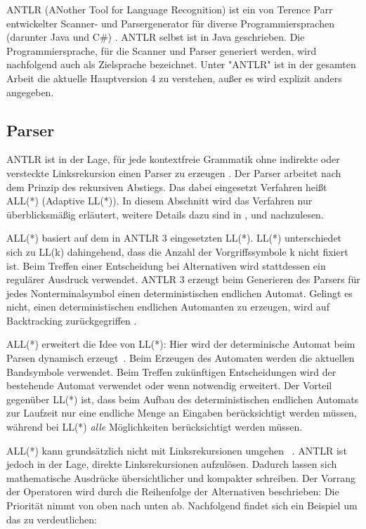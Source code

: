 ANTLR (ANother Tool for Language Recognition) ist ein von Terence Parr entwickelter Scanner- und Parsergenerator für diverse Programmiersprachen (darunter Java und C\#{}) \cite{ANTLR4Reference} \cite{ANTLRWebsite}. ANTLR selbst ist in Java geschrieben. Die Programmiersprache, für die Scanner und Parser generiert werden, wird nachfolgend auch als Zielsprache bezeichnet. Unter "ANTLR" ist in der gesamten Arbeit die aktuelle Hauptversion 4 zu verstehen, außer es wird explizit anders angegeben.

\subsection{Parser}

ANTLR ist in der Lage, für jede kontextfreie Grammatik ohne indirekte oder versteckte Linksrekursion einen Parser zu erzeugen \cite{ANTLRALLStar}. Der Parser arbeitet nach dem Prinzip des rekursiven Abstiegs. Das dabei eingesetzt Verfahren heißt ALL(*) (Adaptive LL(*)). In diesem Abschnitt wird das Verfahren nur überblicksmäßig erläutert, weitere Details dazu sind in \cite{ANTLR4Reference}, \cite{ANTLRLLStar} und \cite{ANTLRALLStar} nachzulesen.

ALL(*) basiert auf dem in ANTLR 3 eingesetzten LL(*). LL(*) unterschiedet sich zu LL(k) dahingehend, dass die Anzahl der Vorgriffssymbole k nicht fixiert ist. Beim Treffen einer Entscheidung bei Alternativen wird stattdessen ein regulärer Ausdruck verwendet. ANTLR 3 erzeugt beim Generieren des Parsers für jedes Nonterminalsymbol einen deterministischen endlichen Automat. Gelingt es nicht, einen deterministischen endlichen Automanten zu erzeugen, wird auf Backtracking zurückgegriffen \cite{ANTLRLLStar}.

ALL(*) erweitert die Idee von LL(*): Hier wird der determinische Automat beim Parsen dynamisch erzeugt \cite{ANTLRALLStar}. Beim Erzeugen des Automaten werden die aktuellen Bandsymbole verwendet. Beim Treffen zukünftigen Entscheidungen wird der bestehende Automat verwendet oder wenn notwendig erweitert. Der Vorteil gegenüber LL(*) ist, dass beim Aufbau des deterministischen endlichen Automats zur Laufzeit nur eine endliche Menge an Eingaben berücksichtigt werden müssen, während bei LL(*) \emph{alle} Möglichkeiten berücksichtigt werden müssen.

ALL(*) kann grundsätzlich nicht mit Linksrekursionen umgehen \cite{ANTLR4Reference} \cite{ANTLRALLStar}. ANTLR ist jedoch in der Lage, direkte Linksrekursionen aufzulösen. Dadurch lassen sich mathematische Ausdrücke übersichtlicher und kompakter schreiben. Der Vorrang der Operatoren wird durch die Reihenfolge der Alternativen beschrieben: Die Priorität nimmt von oben nach unten ab. Nachfolgend findet sich ein Beispiel um das zu verdeutlichen:

